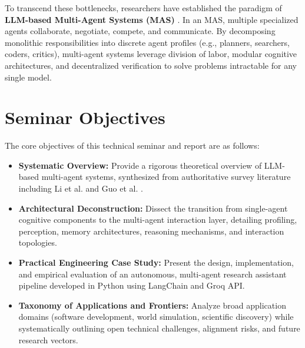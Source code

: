 \documentclass[12pt,a4paper]{report}
\begin{document}
To transcend these bottlenecks, researchers have established the paradigm of \textbf{LLM-based Multi-Agent Systems (MAS)} \cite{li2024survey, guo2024large}. In an MAS, multiple specialized agents collaborate, negotiate, compete, and communicate. By decomposing monolithic responsibilities into discrete agent profiles (e.g., planners, searchers, coders, critics), multi-agent systems leverage division of labor, modular cognitive architectures, and decentralized verification to solve problems intractable for any single model.

\section{Seminar Objectives}
The core objectives of this technical seminar and report are as follows:
\begin{itemize}
    \item \textbf{Systematic Overview:} Provide a rigorous theoretical overview of LLM-based multi-agent systems, synthesized from authoritative survey literature including Li et al. \cite{li2024survey} and Guo et al. \cite{guo2024large}.
    \item \textbf{Architectural Deconstruction:} Dissect the transition from single-agent cognitive components to the multi-agent interaction layer, detailing profiling, perception, memory architectures, reasoning mechanisms, and interaction topologies.
    \item \textbf{Practical Engineering Case Study:} Present the design, implementation, and empirical evaluation of an autonomous, multi-agent research assistant pipeline developed in Python using LangChain and Groq API.
    \item \textbf{Taxonomy of Applications and Frontiers:} Analyze broad application domains (software development, world simulation, scientific discovery) while systematically outlining open technical challenges, alignment risks, and future research vectors.
\end{itemize}
\end{document}
